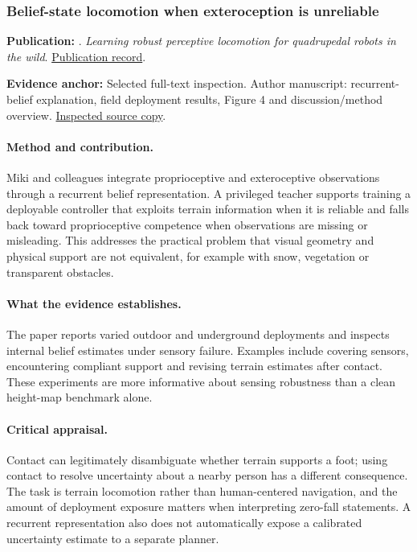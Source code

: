 \subsubsection{Belief-state locomotion when exteroception is unreliable}\label{paper:rough}
\textbf{Publication:} \citet{rough}. \emph{Learning robust perceptive locomotion for quadrupedal robots in the wild}. \href{https://doi.org/10.1126/scirobotics.abk2822}{Publication record}.

\textbf{Evidence anchor:} Selected full-text inspection. Author manuscript: recurrent-belief explanation, field deployment results, Figure 4 and discussion/method overview. \href{https://arxiv.org/pdf/2201.08117}{Inspected source copy}.

\paragraph{Method and contribution.} Miki and colleagues integrate proprioceptive and exteroceptive observations through a recurrent belief representation. A privileged teacher supports training a deployable controller that exploits terrain information when it is reliable and falls back toward proprioceptive competence when observations are missing or misleading. This addresses the practical problem that visual geometry and physical support are not equivalent, for example with snow, vegetation or transparent obstacles.

\paragraph{What the evidence establishes.} The paper reports varied outdoor and underground deployments and inspects internal belief estimates under sensory failure. Examples include covering sensors, encountering compliant support and revising terrain estimates after contact. These experiments are more informative about sensing robustness than a clean height-map benchmark alone.

\paragraph{Critical appraisal.} Contact can legitimately disambiguate whether terrain supports a foot; using contact to resolve uncertainty about a nearby person has a different consequence. The task is terrain locomotion rather than human-centered navigation, and the amount of deployment exposure matters when interpreting zero-fall statements. A recurrent representation also does not automatically expose a calibrated uncertainty estimate to a separate planner.

